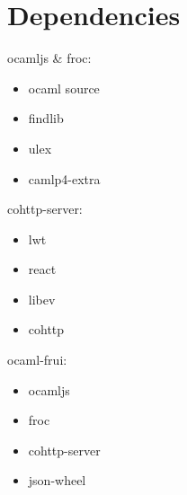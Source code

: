 \section{Dependencies}
ocamljs \& froc:
\begin{itemize}
\item ocaml source
\item findlib
\item ulex
\item camlp4-extra
\end{itemize}
cohttp-server:
\begin{itemize}
\item lwt
\item react
\item libev
\item cohttp
\end{itemize}
ocaml-frui:
\begin{itemize}
\item ocamljs
\item froc
\item cohttp-server
\item json-wheel
\end{itemize}
